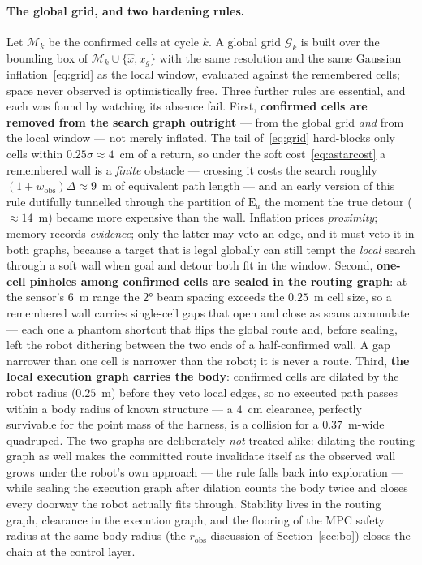 \documentclass[11pt,a4paper]{article}
\newcommand{\robs}{r_{\mathrm{obs}}}
\begin{document}
\paragraph{The global grid, and two hardening rules.} Let $\mathcal{M}_k$ be the confirmed cells at cycle
$k$. A global grid $\mathcal{G}_k$ is built over the bounding box of $\mathcal{M}_k\cup\{\hat x,x_g\}$ with
the same resolution and the same Gaussian inflation~\eqref{eq:grid} as the local window, evaluated against
the remembered cells; space never observed is optimistically free. Three further rules are essential, and
each was found by watching its absence fail. First, \textbf{confirmed cells are removed from the search
graph outright} --- from the global grid \emph{and} from the local window --- not merely inflated. The tail
of~\eqref{eq:grid} hard-blocks only cells within $0.25\sigma\approx4$~cm of a return, so under the soft
cost~\eqref{eq:astarcost} a remembered wall is a \emph{finite} obstacle --- crossing it costs the search
roughly $(1+w_{\mathrm{obs}})\Delta\approx9$~m of equivalent path length --- and an early version of this
rule dutifully tunnelled through the partition of $\mathrm{E}_a$ the moment the true detour ($\approx14$~m)
became more expensive than the wall. Inflation prices \emph{proximity}; memory records \emph{evidence}; only
the latter may veto an edge, and it must veto it in both graphs, because a target that is legal globally can
still tempt the \emph{local} search through a soft wall when goal and detour both fit in the window. Second,
\textbf{one-cell pinholes among confirmed cells are sealed in the routing graph}: at the sensor's $6$~m
range the $2°$ beam spacing exceeds the $0.25$~m cell size, so a remembered wall carries single-cell gaps
that open and close as scans accumulate --- each one a phantom shortcut that flips the global route and,
before sealing, left the robot dithering between the two ends of a half-confirmed wall. A gap narrower than
one cell is narrower than the robot; it is never a route. Third, \textbf{the local execution graph carries
the body}: confirmed cells are dilated by the robot radius ($0.25$~m) before they veto local edges, so no
executed path passes within a body radius of known structure --- a $4$~cm clearance, perfectly survivable
for the point mass of the harness, is a collision for a $0.37$~m-wide quadruped. The two graphs are
deliberately \emph{not} treated alike: dilating the routing graph as well makes the committed route
invalidate itself as the observed wall grows under the robot's own approach --- the rule falls back into
exploration --- while sealing the execution graph after dilation counts the body twice and closes every
doorway the robot actually fits through. Stability lives in the routing graph, clearance in the execution
graph, and the flooring of the MPC safety radius at the same body radius (the $\robs$ discussion of
Section~\ref{sec:bo}) closes the chain at the control layer.
\end{document}
